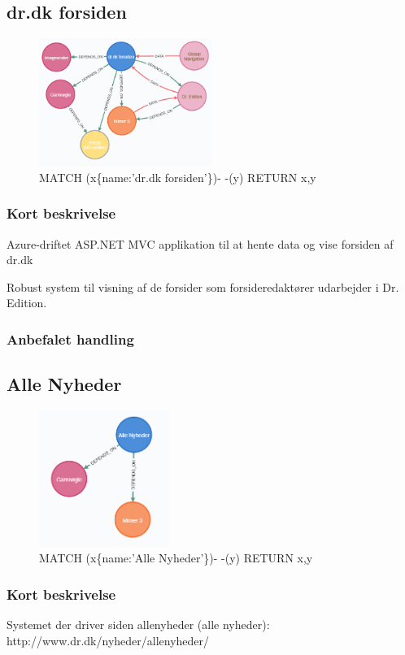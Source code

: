 \documentclass{article}
\begin{document}
\subsection{dr.dk forsiden}
\begin{figure}[h]
\includegraphics[width=160pt]{DrDkForsiden.PNG}
\caption{MATCH (x\{name:'dr.dk forsiden'\})- -(y) RETURN x,y}
\end{figure}
\subsubsection*{Kort beskrivelse}
Azure-driftet ASP.NET MVC applikation til at hente data og vise forsiden af dr.dk

Robust system til visning af de forsider som forsideredaktører udarbejder i Dr. Edition.
\subsubsection*{Anbefalet handling}



\subsection{Alle Nyheder}
\begin{figure}[h]
\includegraphics[width=120pt]{AlleNyheder.PNG}
\caption{MATCH (x\{name:'Alle Nyheder'\})- -(y) RETURN x,y}
\end{figure}
\subsubsection*{Kort beskrivelse}
Systemet der driver siden allenyheder (alle nyheder): http://www.dr.dk/nyheder/allenyheder/	
\end{document}
